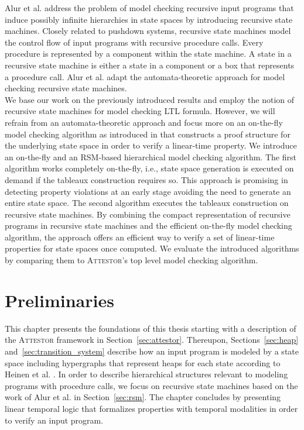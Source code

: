 \documentclass[a4paper, 12pt, twoside]{report}
\begin{document}
	Alur et al. \cite{alur2001analysis} address the problem of model checking recursive input programs that induce possibly infinite hierarchies in state spaces by introducing recursive state machines. Closely related to pushdown systems, recursive state machines model the control flow of input programs with recursive procedure calls. Every procedure is represented by a component within the state machine. A state in a recursive state machine is either a state in a component or a box that represents a procedure call. Alur et al. adapt the automata-theoretic approach for model checking recursive state machines.\\
	
	We base our work on the previously introduced results and employ the notion of recursive state machines for model checking LTL formula. However, we will refrain from an automata-theoretic approach and focus more on an on-the-fly model checking algorithm as introduced in \cite{bhat1995efficient} that constructs a proof structure for the underlying state space in order to verify a linear-time property. We introduce an on-the-fly and an RSM-based hierarchical model checking algorithm. The first algorithm works completely on-the-fly, i.e., state space generation is executed on demand if the tableaux construction requires so. This approach is promising in detecting property violations at an early stage avoiding the need to generate an entire state space. The second algorithm executes the tableaux construction on recursive state machines. By combining the compact representation of recursive programs in recursive state machines and the efficient on-the-fly model checking algorithm, the approach offers an efficient way to verify a set of linear-time properties for state spaces once computed. We evaluate the introduced algorithms by comparing them to \textsc{Attestor}'s top level model checking algorithm. 
	
	\chapter{Preliminaries}\label{chp:preliminaries}
	
	This chapter presents the foundations of this thesis starting with a description of the \textsc{Attestor} framework in Section~\ref{sec:attestor}. Thereupon, Sections~\ref{sec:heap} and~\ref{sec:transition_system} describe how an input program is modeled by a state space including hypergraphs that represent heaps for each state according to Heinen et al. \cite{heinen2015juggrnaut}. In order to describe hierarchical structures relevant to modeling programs with procedure calls, we focus on recursive state machines based on the work of Alur et al. \cite{alur2001analysis} in Section~\ref{sec:rsm}. The chapter concludes by presenting linear temporal logic that formalizes properties with temporal modalities in order to verify an input program.
	
\end{document}
